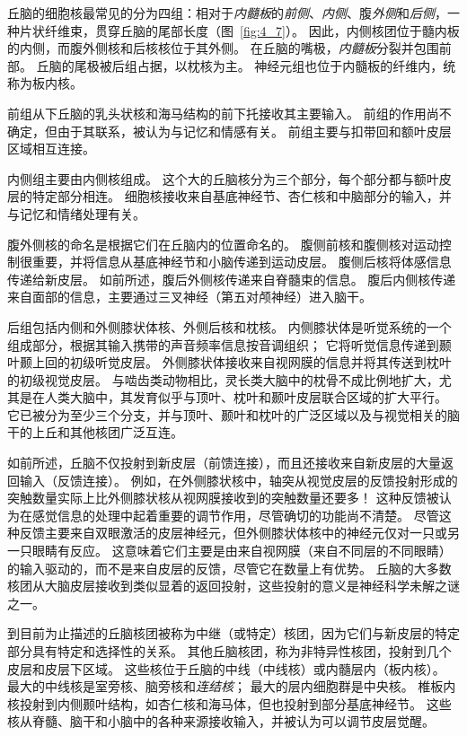 丘脑的细胞核最常见的分为四组：相对于\textit{内髓板}的\textit{前侧}、\textit{内侧}、腹\textit{外侧}和\textit{后侧}，一种片状纤维束，贯穿丘脑的尾部长度（图~\ref{fig:4_7}）。
因此，内侧核团位于髓内板的内侧，而腹外侧核和后核核位于其外侧。
在丘脑的嘴极，\textit{内髓板}分裂并包围前部。
丘脑的尾极被后组占据，以枕核为主。
神经元组也位于内髓板的纤维内，统称为板内核。


前组从下丘脑的乳头状核和海马结构的前下托接收其主要输入。 
前组的作用尚不确定，但由于其联系，被认为与记忆和情感有关。 
前组主要与扣带回和额叶皮层区域相互连接。


内侧组主要由内侧核组成。 
这个大的丘脑核分为三个部分，每个部分都与额叶皮层的特定部分相连。 
细胞核接收来自基底神经节、杏仁核和中脑部分的输入，并与记忆和情绪处理有关。


腹外侧核的命名是根据它们在丘脑内的位置命名的。 
腹侧前核和腹侧核对运动控制很重要，并将信息从基底神经节和小脑传递到运动皮层。
腹侧后核将体感信息传递给新皮层。
如前所述，腹后外侧核传递来自脊髓束的信息。
腹后内侧核传递来自面部的信息，主要通过三叉神经（第五对颅神经）进入脑干。


后组包括内侧和外侧膝状体核、外侧后核和枕核。 
内侧膝状体是听觉系统的一个组成部分，根据其输入携带的声音频率信息按音调组织； 它将听觉信息传递到颞叶颞上回的初级听觉皮层。 
外侧膝状体接收来自视网膜的信息并将其传送到枕叶的初级视觉皮层。 
与啮齿类动物相比，灵长类大脑中的枕骨不成比例地扩大，尤其是在人类大脑中，其发育似乎与顶叶、枕叶和颞叶皮层联合区域的扩大平行。 
它已被分为至少三个分支，并与顶叶、颞叶和枕叶的广泛区域以及与视觉相关的脑干的上丘和其他核团广泛互连。


如前所述，丘脑不仅投射到新皮层（前馈连接），而且还接收来自新皮层的大量返回输入（反馈连接）。 
例如，在外侧膝状核中，轴突从视觉皮层的反馈投射形成的突触数量实际上比外侧膝状核从视网膜接收到的突触数量还要多！ 
这种反馈被认为在感觉信息的处理中起着重要的调节作用，尽管确切的功能尚不清楚。 
尽管这种反馈主要来自双眼激活的皮层神经元，但外侧膝状体核中的神经元仅对一只或另一只眼睛有反应。 
这意味着它们主要是由来自视网膜（来自不同层的不同眼睛）的输入驱动的，而不是来自皮层的反馈，尽管它在数量上有优势。 
丘脑的大多数核团从大脑皮层接收到类似显着的返回投射，这些投射的意义是神经科学未解之谜之一。


到目前为止描述的丘脑核团被称为中继（或特定）核团，因为它们与新皮层的特定部分具有特定和选择性的关系。 其他丘脑核团，称为非特异性核团，投射到几个皮层和皮层下区域。 
这些核位于丘脑的中线（中线核）或内髓层内（板内核）。 
最大的中线核是室旁核、脑旁核和\textit{连结核}；
最大的层内细胞群是中央核。 
椎板内核投射到内侧颞叶结构，如杏仁核和海马体，但也投射到部分基底神经节。
这些核从脊髓、脑干和小脑中的各种来源接收输入，并被认为可以调节皮层觉醒。


